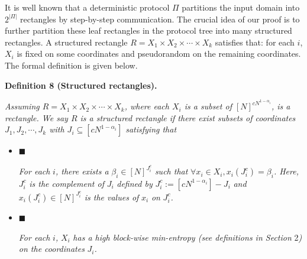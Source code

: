 It is well known that a deterministic protocol $\Pi$ partitions the input domain into $2^{|\Pi|}$ rectangles by step-by-step communication. The crucial idea of our proof is to further partition these leaf rectangles in the protocol tree into many structured rectangles. A structured rectangle $R=X_{1}\times X_{2}\times\cdots\times X_{k}$ satisfies that: for each $i$, $X_{i}$ is fixed on some coordinates and pseudorandom on the remaining coordinates. The formal definition is given below.\par





\par\medskip\noindent\textbf{
\textbf{Definition 8}\textbf{ }(Structured rectangles)\textbf{.}
}\par



\emph{Assuming $R=X_{1}\times X_{2}\times\cdots\times X_{k}$, where each $X_{i}$ is a subset of $[N]^{cN^{1-\alpha_{i}}}$, is a rectangle. We say $R$ is a structured rectangle if there exist subsets of coordinates $J_{1},J_{2},\cdots,J_{k}$ with $J_{i}\subseteq[cN^{1-\alpha_{i}}]$ satisfying that}\par


\begin{itemize}


\item[] 
$\blacksquare$ 


\emph{For each }$i$\emph{, there exists a }$\beta_{i}\in[N]^{J_{i}^{c}}$\emph{ such that }$\forall x_{i}\in X_{i},x_{i}(J_{i}^{c})=\beta_{i}$\emph{. Here, }$J_{i}^{c}$\emph{ is the complement of }$J_{i}$\emph{ defined by }$J_{i}^{c}:=[cN^{1-\alpha_{i}}]-J_{i}$\emph{ and }$x_{i}(J_{i}^{c})\in[N]^{J_{i}^{c}}$\emph{ is the values of }$x_{i}$\emph{ on }$J_{i}^{c}$\emph{.}\par





\item[] 
$\blacksquare$ 


\emph{For each }$i$\emph{, }$X_{i}$\emph{ has a high block-wise min-entropy (see definitions in Section }2\emph{) on the coordinates }$J_{i}$\emph{.}\par





\end{itemize}



